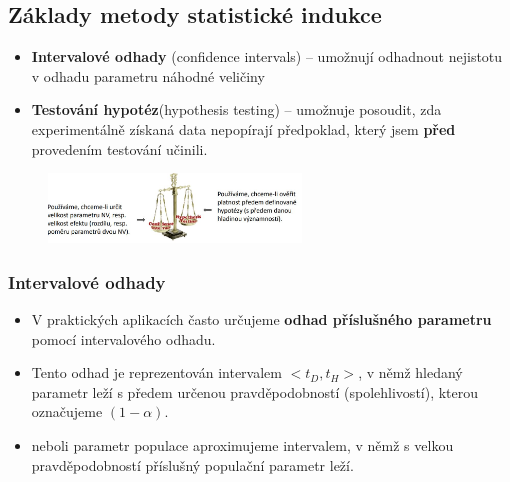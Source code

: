 \subsection{Základy metody statistické indukce}
\begin{itemize}
	\item \textbf{Intervalové odhady} (confidence intervals) -- umožnují odhadnout nejistotu v odhadu parametru náhodné veličiny 
	\item \textbf{Testování hypotéz}(hypothesis testing) -- umožnuje posoudit, zda experimentálně získaná data nepopírají předpoklad, který jsem \textbf{před} provedením testování učinili.
\end{itemize}
\begin{figure}[H]
\centering
\includegraphics[width=0.6\textwidth]{assets/14_metody_stat_ind}
\end{figure}
\subsubsection{Intervalové odhady}
\begin{itemize}
\item V praktických aplikacích často určujeme \textbf{odhad příslušného parametru} pomocí intervalového odhadu.
\item Tento odhad je reprezentován intervalem $<t_D, t_H>$, v němž hledaný parametr leží s předem určenou pravděpodobností (spolehlivostí), kterou označujeme $(1 − \alpha)$.
\item neboli parametr populace aproximujeme intervalem, v němž s velkou pravděpodobností příslušný populační parametr leží.
\end{itemize}

